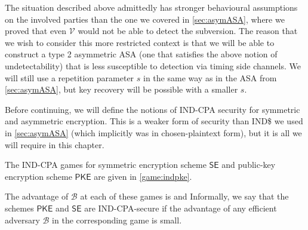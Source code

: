 The situation described above admittedly has stronger behavioural assumptions on the involved parties than the one we covered in \autoref{sec:asymASA}, where we proved that even $\mathcal{V}$ would not be able to detect the subversion. The reason that we wish to consider this more restricted context is that we will be able to construct a type 2 asymmetric ASA (one that satisfies the above notion of undetectability) that is less susceptible to detection via timing side channels. We will still use a repetition parameter $s$ in the same way as in the ASA from \autoref{sec:asymASA}, but key recovery will be possible with a smaller $s$.

Before continuing, we will define the notions of IND-CPA security for symmetric and asymmetric encryption. This is a weaker form of security than IND\$ we used in \autoref{sec:asymASA} (which implicitly was in chosen-plaintext form), but it is all we will require in this chapter.

The IND-CPA games for symmetric encryption scheme $\mathsf{SE}$ and public-key encryption scheme $\mathsf{PKE}$ are given in \autoref{game:indpke}.

The advantage of $\mathcal{B}$ at each of these games is
and
Informally, we say that the schemes $\mathsf{PKE}$ and $\mathsf{SE}$ are IND-CPA-secure if the advantage of any efficient adversary $\mathcal{B}$ in the corresponding game is small.

